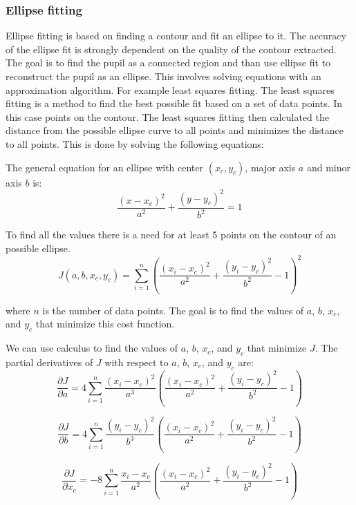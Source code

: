     \subsubsection{Ellipse fitting}
    Ellipse fitting is based on finding a contour and fit an ellipse to it. The accuracy of the ellipse fit is strongly dependent on the quality of the contour extracted. The goal is to find the pupil as a connected region and than use ellipse fit to reconstruct the pupil as an ellipse. This involves solving equations with an approximation algorithm. For example least squares fitting. The least squares fitting is a method to find the best possible fit based on a set of data points. In this case points on the contour. The least squares fitting then calculated the distance from the possible ellipse curve to all points and minimizes the distance to all points. This is done by solving the following equations: 


 The general equation for an ellipse with center $(x_c, y_c)$, major axis $a$ and minor axis $b$ is:
\begin{equation}
    \frac{(x-x_c)^2}{a^2} + \frac{(y-y_c)^2}{b^2} = 1 
\end{equation}



To find all the values there is a need for at least 5 points on the contour of an possible ellipse. 
\begin{equation}
    J(a, b, x_c, y_c) = \sum_{i=1}^n \left(\frac{(x_i-x_c)^2}{a^2} + \frac{(y_i-y_c)^2}{b^2} - 1\right)^2
\end{equation}

where $n$ is the number of data points. The goal is to find the values of $a$, $b$, $x_c$, and $y_c$ that minimize this cost function.

We can use calculus to find the values of $a$, $b$, $x_c$, and $y_c$ that minimize $J$. The partial derivatives of $J$ with respect to $a$, $b$, $x_c$, and $y_c$ are:
\begin{equation}
\frac{\partial J}{\partial a} = 4\sum_{i=1}^n \frac{(x_i-x_c)^2}{a^3}\left(\frac{(x_i-x_c)^2}{a^2} + \frac{(y_i-y_c)^2}{b^2} - 1\right)
\end{equation}


\begin{equation}
    \frac{\partial J}{\partial b} = 4\sum_{i=1}^n \frac{(y_i-y_c)^2}{b^3}\left(\frac{(x_i-x_c)^2}{a^2} + \frac{(y_i-y_c)^2}{b^2} - 1\right)
\end{equation}

\begin{equation}
\frac{\partial J}{\partial x_c} = -8\sum_{i=1}^n \frac{x_i-x_c}{a^2}\left(\frac{(x_i-x_c)^2}{a^2} + \frac{(y_i-y_c)^2}{b^2} - 1\right)
\end{equation}

